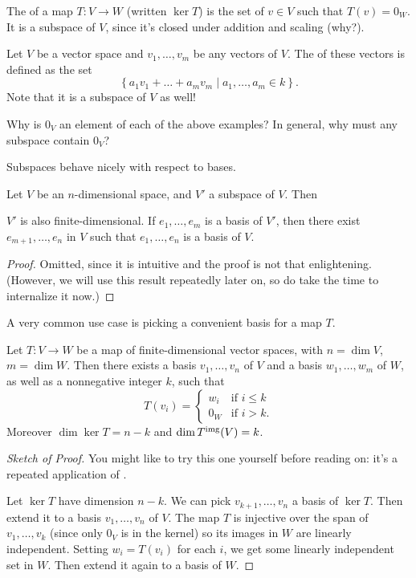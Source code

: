 \begin{example}[Kernels]
	The  of a map $T \colon V \to W$ (written $\ker T$) is
	the set of $v \in V$ such that $T(v) = 0_W$.
	It is a subspace of $V$, since it's closed under addition and scaling (why?).
\end{example}
\begin{example}[Spans]
	Let $V$ be a vector space and $v_1, \dots, v_m$ be any vectors of $V$.
	The  of these vectors is defined as the set
	\[ \left\{ a_1 v_1 + \dots + a_m v_m \mid a_1, \dots, a_m \in k \right\}. \]
	Note that it is a subspace of $V$ as well!
\end{example}
\begin{ques}
	Why is $0_V$ an element of each of the above examples?
	In general, why must any subspace contain $0_V$?
\end{ques}

Subspaces behave nicely with respect to bases.
\begin{theorem}
	\label{thm:basis_completion}
	Let $V$ be an $n$-dimensional space, and $V'$ a subspace of $V$.
	Then
	\begin{enumerate}[(a)]
		\ii $V'$ is also finite-dimensional.
		\ii If $e_1, \dots, e_m$ is a basis of $V'$, then there exist
		$e_{m+1}, \dots, e_n$ in $V$ such that
		$e_1, \dots, e_n$ is a basis of $V$.
	\end{enumerate}
\end{theorem}
\begin{proof}
	Omitted, since it is intuitive and the proof is not that enlightening.
	(However, we will use this result repeatedly later on,
	so do take the time to internalize it now.)
\end{proof}

A very common use case is picking a convenient basis for a map $T$.
\begin{theorem}
	\label{thm:linear_map_basis}
	Let $T \colon V \to W$ be a map of finite-dimensional vector spaces,
	with $n = \dim V$, $m = \dim W$.
	Then there exists a basis $v_1, \dots, v_n$ of $V$
	and a basis $w_1, \dots, w_m$ of $W$,
	as well as a nonnegative integer $k$, such that
	\[
		T(v_i) =
		\begin{cases}
			w_i & \text{if $i \le k$} \\
			0_W & \text{if $i > k$}.
		\end{cases}
	\]
	Moreover $\dim \ker T = n-k$ and $\dim T^{\text{img}}(V) = k$.
\end{theorem}
\begin{proof}[Sketch of Proof]
	You might like to try this one yourself before reading on:
	it's a repeated application of .

	Let $\ker T$ have dimension $n-k$.
	We can pick $v_{k+1}, \dots, v_{n}$ a basis of $\ker T$.
	Then extend it to a basis $v_1, \dots, v_n$ of $V$.
	The map $T$ is injective over the span of $v_1, \dots, v_k$
	(since only $0_V$ is in the kernel) so its images in $W$ are linearly independent.
	Setting $w_i = T(v_i)$ for each $i$,
	we get some linearly independent set in $W$.
	Then extend it again to a basis of $W$.
\end{proof}

